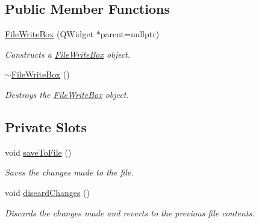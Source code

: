 \subsection*{Public Member Functions}
\begin{DoxyCompactItemize}
\item 
\hyperlink{classFileWriteBox_a8074a794a08c2417cd54ff2175729e1a}{File\+Write\+Box} (Q\+Widget $\ast$parent=nullptr)
\begin{DoxyCompactList}\small\item\em Constructs a \hyperlink{classFileWriteBox}{File\+Write\+Box} object. \end{DoxyCompactList}\item 
\hyperlink{classFileWriteBox_acb7de5b93818d27ce99a5c6566ba0ec5}{$\sim$\+File\+Write\+Box} ()
\begin{DoxyCompactList}\small\item\em Destroys the \hyperlink{classFileWriteBox}{File\+Write\+Box} object. \end{DoxyCompactList}\end{DoxyCompactItemize}
\subsection*{Private Slots}
\begin{DoxyCompactItemize}
\item 
void \hyperlink{classFileWriteBox_a2567b35b54e7f5e87069c9ea5dc82b9b}{save\+To\+File} ()
\begin{DoxyCompactList}\small\item\em Saves the changes made to the file. \end{DoxyCompactList}\item 
void \hyperlink{classFileWriteBox_a5db76473f102a2cc369390cd0638eb86}{discard\+Changes} ()
\begin{DoxyCompactList}\small\item\em Discards the changes made and reverts to the previous file contents. \end{DoxyCompactList}\end{DoxyCompactItemize}
